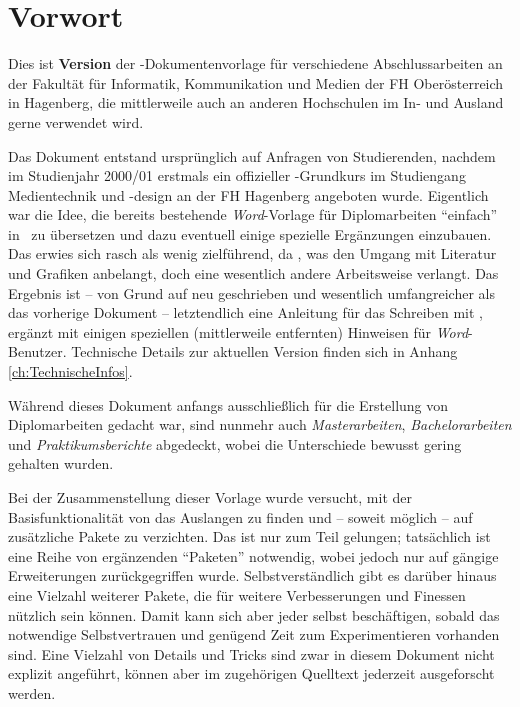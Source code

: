 \chapter{Vorwort} 	%


Dies ist \textbf{Version \hgbthesisDate} der \latex-Dokumentenvorlage für 
verschiedene Abschlussarbeiten an der Fakultät für Informatik, Kommunikation
und Medien der FH Oberösterreich in Hagenberg, die mittlerweile auch 
an anderen Hochschulen im In- und Ausland gerne verwendet wird.

Das Dokument entstand ursprünglich auf Anfragen von Studierenden,
nachdem im Studienjahr 2000/01 erstmals ein offizieller
\latex-Grundkurs im Studiengang Medientechnik und -design an der
FH Hagenberg angeboten wurde. Eigentlich war die Idee, die bereits
bestehende \emph{Word}-Vorlage für Diplomarbeiten "`einfach"' in
\latex\ zu übersetzen und dazu eventuell einige spezielle
Ergänzungen einzubauen. Das erwies sich rasch als wenig
zielführend, da \latex, \va was den Umgang mit Literatur und
Grafiken anbelangt, doch eine wesentlich andere Arbeitsweise
verlangt. Das Ergebnis ist -- von Grund auf neu geschrieben und
wesentlich umfangreicher als das vorherige Dokument --
letztendlich eine Anleitung für das Schreiben mit \latex, ergänzt
mit einigen speziellen (mittlerweile entfernten) Hinweisen für \emph{Word}-Benutzer.
Technische Details zur aktuellen Version finden sich in Anhang \ref{ch:TechnischeInfos}.

Während dieses Dokument anfangs ausschließlich für die Erstellung
von Diplomarbeiten gedacht war, sind nunmehr auch  
\emph{Masterarbeiten}, \emph{Bachelor\-arbeiten} und \emph{Praktikumsberichte} 
abgedeckt, wobei die Unterschiede bewusst gering gehalten wurden.

Bei der Zusammenstellung dieser Vorlage wurde versucht, mit der
Basisfunktionalität von \latex das Auslangen zu finden und -- soweit möglich --
auf zusätzliche Pakete zu verzichten. Das ist nur zum Teil gelungen;
tat\-säch\-lich ist eine Reihe von ergänzenden "`Paketen"' notwendig, wobei jedoch
nur auf gängige Erweiterungen zurückgegriffen wurde.
Selbstverständlich gibt es darüber hinaus eine Vielzahl weiterer Pakete,
die für weitere Verbesserungen und Finessen nützlich sein können. Damit kann
sich aber jeder selbst beschäftigen, sobald das notwendige Selbstvertrauen und
genügend Zeit zum Experimentieren vorhanden sind.
Eine Vielzahl von Details und Tricks sind zwar in diesem Dokument nicht explizit
angeführt, können aber im zugehörigen Quelltext jederzeit ausgeforscht
werden.

